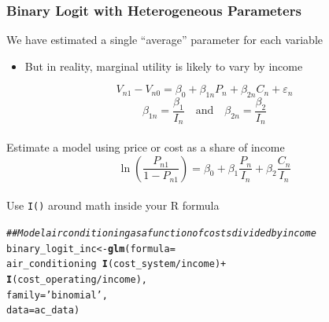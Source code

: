 \documentclass{beamer}\usepackage[]{graphicx}\usepackage[]{xcolor}
\makeatletter
\newcommand{\hlstr}[1]{\textcolor[rgb]{0.192,0.494,0.8}{#1}}%
\newcommand{\hlcom}[1]{\textcolor[rgb]{0.678,0.584,0.686}{\textit{#1}}}%
\newcommand{\hlopt}[1]{\textcolor[rgb]{0,0,0}{#1}}%
\newcommand{\hlstd}[1]{\textcolor[rgb]{0.345,0.345,0.345}{#1}}%
\newcommand{\hlkwb}[1]{\textcolor[rgb]{0.69,0.353,0.396}{#1}}%
\newcommand{\hlkwc}[1]{\textcolor[rgb]{0.333,0.667,0.333}{#1}}%
\newcommand{\hlkwd}[1]{\textcolor[rgb]{0.737,0.353,0.396}{\textbf{#1}}}%
\newenvironment{kframe}{%
 \def\at@end@of@kframe{}%
 \ifinner\ifhmode%
  \def\at@end@of@kframe{\end{minipage}}%
  \begin{minipage}{\columnwidth}%
 \fi\fi%
 \def\FrameCommand##1{\hskip\@totalleftmargin \hskip-\fboxsep
 \colorbox{shadecolor}{##1}\hskip-\fboxsep
     \hskip-\linewidth \hskip-\@totalleftmargin \hskip\columnwidth}%
 \MakeFramed {\advance\hsize-\width
   \@totalleftmargin\z@ \linewidth\hsize
   \@setminipage}}%
 {\par\unskip\endMakeFramed%
 \at@end@of@kframe}
\newenvironment{knitrout}{}{} %
\makeatother
\begin{document}
\begin{frame}[fragile]\frametitle{Binary Logit with Heterogeneous Parameters}
    We have estimated a single ``average'' parameter for each variable
    \begin{itemize}
        \item But in reality, marginal utility is likely to vary by income
    \end{itemize}
    $$V_{n1} - V_{n0} = \beta_0 + \beta_{1n} P_n + \beta_{2n} C_n + \varepsilon_n$$
    $$\beta_{1n} = \frac{\beta_1}{I_n} \quad \text{and} \quad \beta_{2n} = \frac{\beta_2}{I_n}$$ \\
    \vspace{1ex}
    Estimate a model using price or cost as a share of income
    $$\ln \left( \frac{P_{n1}}{1 - P_{n1}} \right) = \beta_0 + \beta_1 \frac{P_n}{I_n} + \beta_2 \frac{C_n}{I_n}$$ \\
    \vspace{1ex}
    Use \texttt{I()} around math inside your R formula
\begin{knitrout}\footnotesize
{}\color{fgcolor}\begin{kframe}
\begin{alltt}
\hlcom{## Model air conditioning as a function of costs divided by income}
\hlstd{binary_logit_inc} \hlkwb{<-} \hlkwd{glm}\hlstd{(}\hlkwc{formula} \hlstd{=}
                          \hlstd{air_conditioning} \hlopt{~} \hlkwd{I}\hlstd{(cost_system} \hlopt{/} \hlstd{income)} \hlopt{+}
                          \hlkwd{I}\hlstd{(cost_operating} \hlopt{/} \hlstd{income),}
                        \hlkwc{family} \hlstd{=} \hlstr{'binomial'}\hlstd{,}
                        \hlkwc{data} \hlstd{= ac_data)}
\end{alltt}
\end{kframe}
\end{knitrout}
\end{frame}
\end{document}
